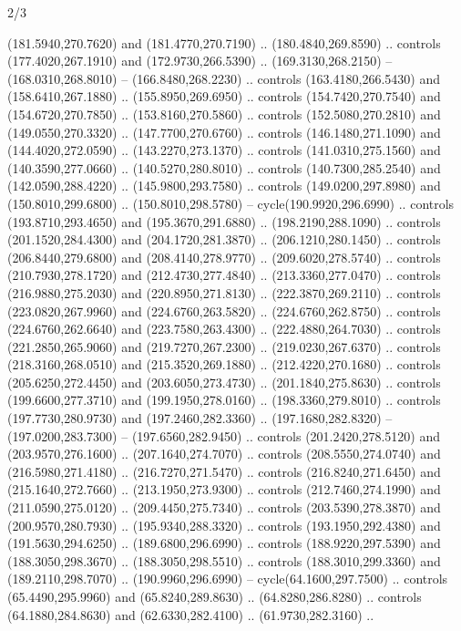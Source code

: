 \begin{flagdescription}{2/3}
\begin{scope}[xshift=0.5\flaglength,yshift=0.5\flagwidth,scale=\stretchfactor]
\begin{scope}[scale=0.001645\flagwidth,yshift=65mm,xshift=-63mm]
\begin{scope}[y=0.80pt, x=0.80pt, yscale=-1,]
\begin{scope}[cm={{1.33333,0.0,0.0,1.33333,(0.0,1e-05)}}]
  (181.5940,270.7620) and (181.4770,270.7190) .. (180.4840,269.8590) .. controls
  (177.4020,267.1910) and (172.9730,266.5390) .. (169.3130,268.2150) --
  (168.0310,268.8010) -- (166.8480,268.2230) .. controls (163.4180,266.5430) and
  (158.6410,267.1880) .. (155.8950,269.6950) .. controls (154.7420,270.7540) and
  (154.6720,270.7850) .. (153.8160,270.5860) .. controls (152.5080,270.2810) and
  (149.0550,270.3320) .. (147.7700,270.6760) .. controls (146.1480,271.1090) and
  (144.4020,272.0590) .. (143.2270,273.1370) .. controls (141.0310,275.1560) and
  (140.3590,277.0660) .. (140.5270,280.8010) .. controls (140.7300,285.2540) and
  (142.0590,288.4220) .. (145.9800,293.7580) .. controls (149.0200,297.8980) and
  (150.8010,299.6800) .. (150.8010,298.5780) -- cycle(190.9920,296.6990) ..
  controls (193.8710,293.4650) and (195.3670,291.6880) .. (198.2190,288.1090) ..
  controls (201.1520,284.4300) and (204.1720,281.3870) .. (206.1210,280.1450) ..
  controls (206.8440,279.6800) and (208.4140,278.9770) .. (209.6020,278.5740) ..
  controls (210.7930,278.1720) and (212.4730,277.4840) .. (213.3360,277.0470) ..
  controls (216.9880,275.2030) and (220.8950,271.8130) .. (222.3870,269.2110) ..
  controls (223.0820,267.9960) and (224.6760,263.5820) .. (224.6760,262.8750) ..
  controls (224.6760,262.6640) and (223.7580,263.4300) .. (222.4880,264.7030) ..
  controls (221.2850,265.9060) and (219.7270,267.2300) .. (219.0230,267.6370) ..
  controls (218.3160,268.0510) and (215.3520,269.1880) .. (212.4220,270.1680) ..
  controls (205.6250,272.4450) and (203.6050,273.4730) .. (201.1840,275.8630) ..
  controls (199.6600,277.3710) and (199.1950,278.0160) .. (198.3360,279.8010) ..
  controls (197.7730,280.9730) and (197.2460,282.3360) .. (197.1680,282.8320) --
  (197.0200,283.7300) -- (197.6560,282.9450) .. controls (201.2420,278.5120) and
  (203.9570,276.1600) .. (207.1640,274.7070) .. controls (208.5550,274.0740) and
  (216.5980,271.4180) .. (216.7270,271.5470) .. controls (216.8240,271.6450) and
  (215.1640,272.7660) .. (213.1950,273.9300) .. controls (212.7460,274.1990) and
  (211.0590,275.0120) .. (209.4450,275.7340) .. controls (203.5390,278.3870) and
  (200.9570,280.7930) .. (195.9340,288.3320) .. controls (193.1950,292.4380) and
  (191.5630,294.6250) .. (189.6800,296.6990) .. controls (188.9220,297.5390) and
  (188.3050,298.3670) .. (188.3050,298.5510) .. controls (188.3010,299.3360) and
  (189.2110,298.7070) .. (190.9960,296.6990) -- cycle(64.1600,297.7500) ..
  controls (65.4490,295.9960) and (65.8240,289.8630) .. (64.8280,286.8280) ..
  controls (64.1880,284.8630) and (62.6330,282.4100) .. (61.9730,282.3160) ..

\end{scope}
\end{scope}
\end{scope}
\end{scope}
\end{flagdescription}
